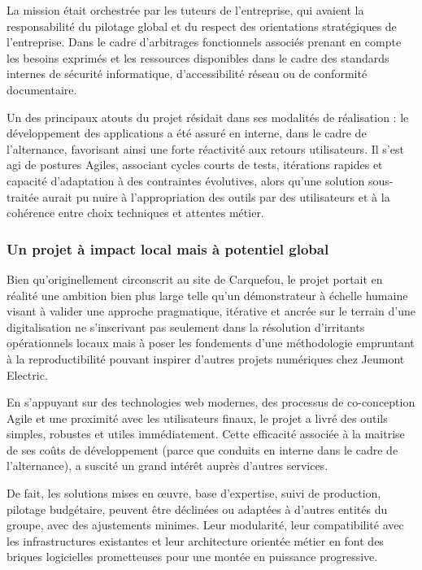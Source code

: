 \documentclass[11pt,a4paper]{article}
\begin{document}
La mission était orchestrée par les tuteurs de l’entreprise, qui avaient la responsabilité du pilotage global et du respect des orientations stratégiques de l’entreprise. Dans le cadre d’arbitrages fonctionnels associés prenant en compte les besoins exprimés et les ressources disponibles dans le cadre des standards internes de sécurité informatique, d’accessibilité réseau ou de conformité documentaire.

Un des principaux atouts du projet résidait dans ses modalités de réalisation : le développement des applications a été assuré en interne, dans le cadre de l’alternance, favorisant ainsi une forte réactivité aux retours utilisateurs. Il s’est agi de postures Agiles, associant cycles courts de tests, itérations rapides et capacité d’adaptation à des contraintes évolutives, alors qu’une solution sous-traitée aurait pu nuire à l’appropriation des outils par des utilisateurs et à la cohérence entre choix techniques et attentes métier.

\subsubsection{Un projet à impact local mais à potentiel global}

Bien qu’originellement circonscrit au site de Carquefou, le projet portait en réalité une ambition bien plus large telle qu’un démonstrateur à échelle humaine visant à valider une approche pragmatique, itérative et ancrée sur le terrain d’une digitalisation ne s’inscrivant pas seulement dans la résolution d’irritants opérationnels locaux mais à poser les fondements d’une méthodologie empruntant à la reproductibilité pouvant inspirer d’autres projets numériques chez Jeumont Electric.

En s’appuyant sur des technologies web modernes, des processus de co-conception Agile et une proximité avec les utilisateurs finaux, le projet a livré des outils simples, robustes et utiles immédiatement. Cette efficacité associée à la maitrise de ses coûts de développement (parce que conduits en interne dans le cadre de l’alternance), a suscité un grand intérêt auprès d’autres services.

De fait, les solutions mises en œuvre, base d’expertise, suivi de production, pilotage budgétaire, peuvent être déclinées ou adaptées à d’autres entités du groupe, avec des ajustements minimes. Leur modularité, leur compatibilité avec les infrastructures existantes et leur architecture orientée métier en font des briques logicielles prometteuses pour une montée en puissance progressive.
\end{document}
